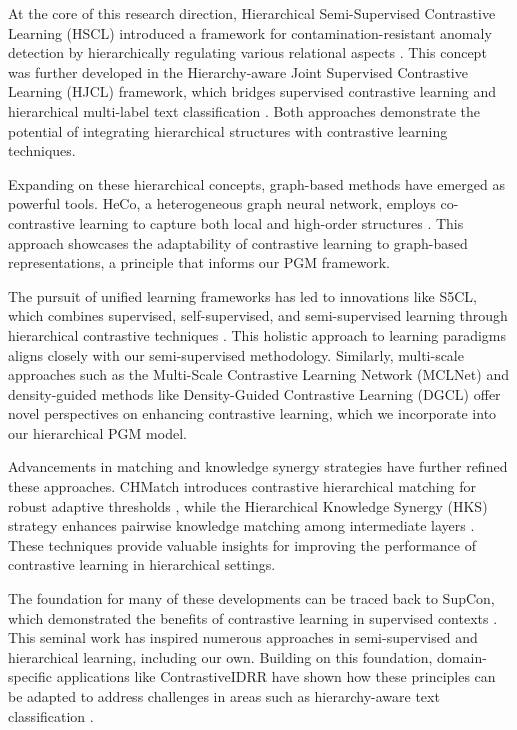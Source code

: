 \documentclass[conference]{IEEEtran}
\begin{document}
At the core of this research direction, Hierarchical Semi-Supervised Contrastive Learning (HSCL) introduced a framework for contamination-resistant anomaly detection by hierarchically regulating various relational aspects \cite{hscl}. This concept was further developed in the Hierarchy-aware Joint Supervised Contrastive Learning (HJCL) framework, which bridges supervised contrastive learning and hierarchical multi-label text classification \cite{hjcl}. Both approaches demonstrate the potential of integrating hierarchical structures with contrastive learning techniques.

Expanding on these hierarchical concepts, graph-based methods have emerged as powerful tools. HeCo, a heterogeneous graph neural network, employs co-contrastive learning to capture both local and high-order structures \cite{heco}. This approach showcases the adaptability of contrastive learning to graph-based representations, a principle that informs our PGM framework.

The pursuit of unified learning frameworks has led to innovations like S5CL, which combines supervised, self-supervised, and semi-supervised learning through hierarchical contrastive techniques \cite{s5cl}. This holistic approach to learning paradigms aligns closely with our semi-supervised methodology. Similarly, multi-scale approaches such as the Multi-Scale Contrastive Learning Network (MCLNet) \cite{mclnet} and density-guided methods like Density-Guided Contrastive Learning (DGCL) \cite{dgcl} offer novel perspectives on enhancing contrastive learning, which we incorporate into our hierarchical PGM model.

Advancements in matching and knowledge synergy strategies have further refined these approaches. CHMatch introduces contrastive hierarchical matching for robust adaptive thresholds \cite{chmatch}, while the Hierarchical Knowledge Synergy (HKS) strategy enhances pairwise knowledge matching among intermediate layers \cite{hks}. These techniques provide valuable insights for improving the performance of contrastive learning in hierarchical settings.

The foundation for many of these developments can be traced back to SupCon, which demonstrated the benefits of contrastive learning in supervised contexts \cite{supcon}. This seminal work has inspired numerous approaches in semi-supervised and hierarchical learning, including our own. Building on this foundation, domain-specific applications like ContrastiveIDRR have shown how these principles can be adapted to address challenges in areas such as hierarchy-aware text classification \cite{contrastiveidrr}.
\end{document}
